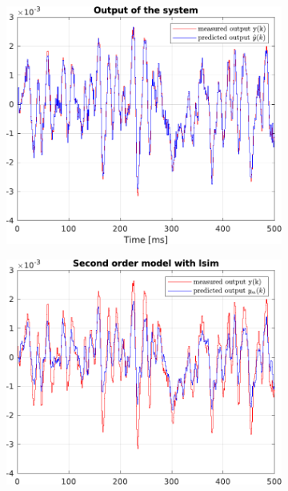 \begin{figure}[h!]
	\centering
	\begin{subfigure}{.49\textwidth}
		\includegraphics[width=\textwidth]{figures/output_arx.pdf}
		\label{fig:output_arx}
	\end{subfigure}\hfill
	\begin{subfigure}{.49\textwidth}
		\includegraphics[width=\textwidth]{figures/output_lsim2.pdf}

\end{subfigure}
\end{figure}

